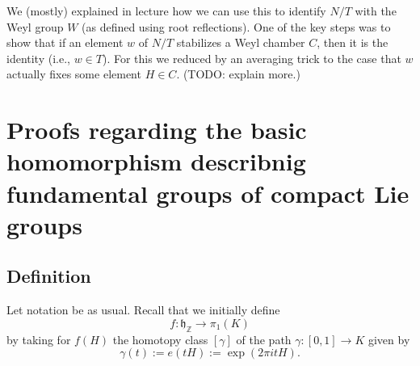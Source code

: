 \documentclass[reqno]{amsart} 
\begin{document}
We (mostly) explained in lecture how we can use this to identify $N/T$ with the Weyl group $W$ (as defined using root reflections).  One of the key steps was to show that if an element $w$ of $N/T$ stabilizes a Weyl chamber $C$, then it is the identity (i.e., $w \in T$).  For this we reduced by an averaging trick to the case that $w$ actually fixes some element $H \in C$.  (TODO: explain more.)

\section{Proofs regarding the basic homomorphism describnig fundamental groups of compact Lie groups}
\label{sec:org1822737}
\subsection{Definition}
\label{sec:org1514b4c}
Let notation be as usual.  Recall that we initially define
\begin{equation*}
  f : \mathfrak{h}_\mathbb{Z} \rightarrow \pi_1(K)
\end{equation*}
by taking for $f(H)$ the homotopy class $[\gamma]$ of the path $\gamma : [0,1]\rightarrow K$ given by
\begin{equation*}
  \gamma(t) := e(t H) := \exp(2 \pi i t H).
\end{equation*}
\end{document}
